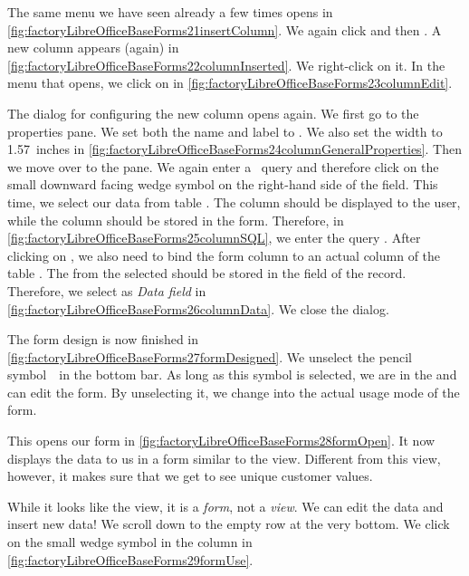 The same menu we have seen already a few times opens in \cref{fig:factoryLibreOfficeBaseForms21insertColumn}.
We again click  and then .
A new  column appears (again) in \cref{fig:factoryLibreOfficeBaseForms22columnInserted}.
We right-click on it.
In the menu that opens, we click on  in \cref{fig:factoryLibreOfficeBaseForms23columnEdit}.

The dialog for configuring the new column opens again.
We first go to the  properties pane.
We set both the name and label to .
We also set the width to 1.57~inches in \cref{fig:factoryLibreOfficeBaseForms24columnGeneralProperties}.
Then we move over to the  pane.
We again enter a \sql\ query and therefore click on the small downward facing wedge symbol on the right-hand side of the  field.
This time, we select our data from table .
The  column should be displayed to the user, while the  column should be stored in the form.
Therefore, in \cref{fig:factoryLibreOfficeBaseForms25columnSQL}, we enter the query .
After clicking on , we also need to bind the form column to an actual column of the table .
The  from the selected  should be stored in the  field of the  record.
Therefore, we select  as \emph{Data field} in \cref{fig:factoryLibreOfficeBaseForms26columnData}.
We close the dialog.

The form design is now finished in \cref{fig:factoryLibreOfficeBaseForms27formDesigned}.
We unselect the pencil symbol~\libreOfficeBaseDesignMode\ in the bottom bar.
As long as this symbol is selected, we are in the  and can edit the form.
By unselecting it, we change into the actual usage mode of the form.

This opens our form in \cref{fig:factoryLibreOfficeBaseForms28formOpen}.
It now displays the data to us in a form similar to the  view.
Different from this view, however, it makes sure that we get to see unique customer values.

While it looks like the  view, it is a \emph{form}, not a \emph{view}.
We can edit the data and insert new data!
We scroll down to the empty row at the very bottom.
We click on the small wedge symbol in the  column in \cref{fig:factoryLibreOfficeBaseForms29formUse}.

